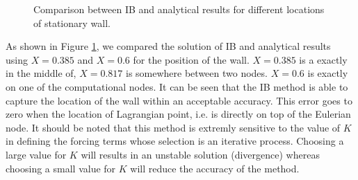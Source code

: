 \begin{figure}[h]
{	}
	\quad
	\caption{Comparison between IB and analytical results for different locations of stationary wall.}
	\label{fig:C3_peskinResults}
\end{figure}

As shown in Figure \ref{fig:C3_peskinResults}, we compared the solution of IB and analytical results using $X=0.385$ and $X=0.6$ for the position of the wall. $X=0.385$ is a exactly in the middle of, $X=0.817$ is somewhere between two nodes. $X=0.6$ is exactly on one of the computational nodes. It can be seen that the IB method is able to capture the location of the wall within an acceptable accuracy. This error goes to zero when the location of Lagrangian point, i.e. is directly on top of the Eulerian node. It should be noted that this method is extremly sensitive to the value of $K$ in defining the forcing terms whose selection is an iterative process. Choosing a large value for $K$ will results in an unstable solution (divergence) whereas choosing a small value for $K$ will reduce the accuracy of the method.

